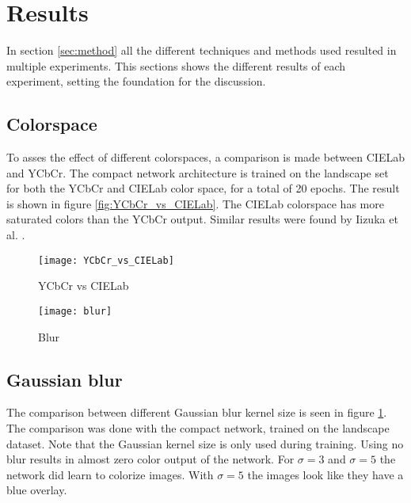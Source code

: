 \section{Results}\label{sec:results}
	
In section \ref{sec:method} all the different techniques and methods used resulted in multiple experiments. This sections shows the different results of each experiment, setting the foundation for the discussion.

\subsection{Colorspace}
To asses the effect of different colorspaces, a comparison is made between CIELab and YCbCr. The compact network architecture is trained on the landscape set for both the YCbCr and CIELab color space, for a total of 20 epochs. The result is shown in figure \ref{fig:YCbCr_vs_CIELab}. The CIELab colorspace has more saturated colors than the YCbCr output. Similar results were found by Iizuka et al. \cite{IizukaSIGGRAPH2016}.

\begin{figure}
	\begin{minipage}{.5\textwidth}
		
		\centering
		\texttt{[image: YCbCr\_vs\_CIELab]}
		\caption{YCbCr vs CIELab}
		\label{fig:YCbCr_vs_CIELab}
		
	\end{minipage}
	\begin{minipage}{0.5\textwidth}
			\centering
			\texttt{[image: blur]}
			\caption{Blur}
			\label{fig:blur}
	\end{minipage}
\end{figure}

\subsection{Gaussian blur}
The comparison between different Gaussian blur kernel size is seen in figure \ref{fig:blur}. The comparison was done with the compact network, trained on the landscape dataset. Note that the Gaussian kernel size is only used during training. Using no blur results in almost zero color output of the network. For $\sigma = 3$ and $\sigma = 5$ the network did learn to colorize images. With $\sigma = 5$ the images look like they have a blue overlay.

